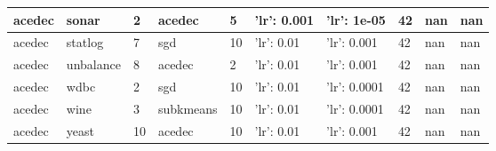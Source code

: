 \begin{table}[H]
\begin{tabular}{|l|l|l|l|l|l|l|l|l|l|}
\hline
acedec & sonar & 2 & acedec & 5 & {'lr': 0.001} & {'lr': 1e-05} & 42 & nan & nan \\
\hline
acedec & statlog & 7 & sgd & 10 & {'lr': 0.01} & {'lr': 0.001} & 42 & nan & nan \\
\hline
acedec & unbalance & 8 & acedec & 2 & {'lr': 0.01} & {'lr': 0.001} & 42 & nan & nan \\
\hline
acedec & wdbc & 2 & sgd & 10 & {'lr': 0.01} & {'lr': 0.0001} & 42 & nan & nan \\
\hline
acedec & wine & 3 & subkmeans & 10 & {'lr': 0.01} & {'lr': 0.0001} & 42 & nan & nan \\
\hline
acedec & yeast & 10 & acedec & 10 & {'lr': 0.01} & {'lr': 0.001} & 42 & nan & nan \\
\hline
\end{tabular}
\end{table}

\clearpage

